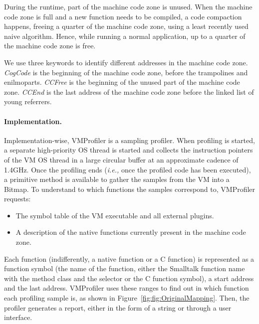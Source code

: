 \documentclass[10pt,preprint,nonatbib]{sigplanconf}
\newcommand{\ie}{\emph{i.e.,}\xspace}
\newcommand{\figref}[1]{Figure~\ref{fig:#1}}
\begin{document}
During the runtime, part of the machine code zone is unused. When the machine code zone is full and a new function needs to be compiled, a code compaction happens, freeing a quarter of the machine code zone, using a least recently used naive algorithm. Hence, while running a normal application, up to a quarter of the machine code zone is free. 

We use three keywords to identify different addresses in the machine code zone. \emph{CogCode} is the beginning of the machine code zone, before the trampolines and enilmoparts. \emph{CCFree} is the beginning of the unused part of the machine code zone. \emph{CCEnd} is the last address of the machine code zone before the linked list of young referrers.

\paragraph{Implementation.} Implementation-wise, VMProfiler is a sampling profiler. When profiling is started, a separate high-priority OS thread is started and collects the instruction pointers of the VM OS thread in a large circular buffer at an approximate cadence of 1.4GHz. Once the profiling ends (\ie once the profiled code has been executed), a primitive method is available to gather the samples from the VM into a Bitmap. To understand to which functions the samples correspond to, VMProfiler requests:
\begin{itemize}
	\item The symbol table of the VM executable and all external plugins.
	\item A description of the native functions currently present in the machine code zone.
\end{itemize}
Each function (indifferently, a native function or a C function) is represented as a function symbol (the name of the function, either the Smalltalk function name with the method class and the selector or the C function symbol), a start address and the last address. VMProfiler uses these ranges to find out in which function each profiling sample is, as shown in \figref{fig:OriginalMapping}. Then, the profiler generates a report, either in the form of a string or through a user interface.
\end{document}
